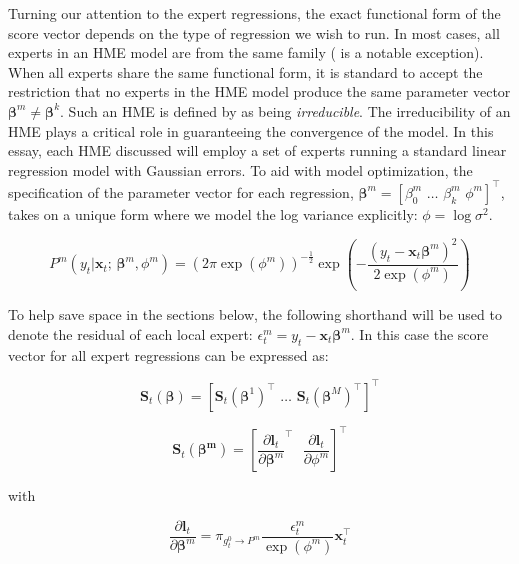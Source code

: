 \documentclass[12pt]{article}
\newcommand{\gateprod}[2]{\pi_{#1 \longrightarrow #2}}
\begin{document}
Turning our attention to the expert regressions, the exact functional form
of the score vector depends on the type of regression we wish to run. In most
cases, all experts in an HME model are from the same family
(\citet{HuertaJiangTanner2003} is a notable exception). When all experts share
the same functional form, it is standard to accept the restriction that no experts
in the HME model produce the same parameter vector
$\boldsymbol{\beta}^{m} \neq \boldsymbol{\beta}^{k}$. Such an HME is defined by
\citet{JiangTanner2000} as being \textit{irreducible}. The irreducibility of an HME
plays a critical role in guaranteeing the convergence of the model.
In this essay, each HME discussed will employ a set of experts running 
a standard linear regression model with Gaussian errors. To aid with model optimization,
the specification of the parameter vector for each regression,
 $\boldsymbol{\beta}^{m} = [\beta_{0}^{m} \,\, \ldots \,\, \beta_{k}^m \,\, \phi^{m}]^{\top}$,
takes on a unique form where we model the log variance explicitly:
$\phi = \log \sigma^{2}$.

\begin{equation}
  P^{m}(y_{t} | \boldsymbol{x}_{t}; \, \boldsymbol{\beta}^{m}, \phi^{m}) = \left( 2 \pi \exp ( \phi^{m} ) \right)^{-\frac{1}{2}} \exp{ \left( -\frac{  ( y_{t} - \boldsymbol{x}_{t} \boldsymbol{\beta}^{m} )^{2}  }{2 \exp (\phi^{m}) } \right) }
\end{equation}

To help save space in the sections below, the following shorthand will be used 
to denote the residual of each local expert: $\epsilon^{m}_{t} = y_{t} - \boldsymbol{x}_{t} \boldsymbol{\beta}^{m}$.
In this case the score vector for all expert regressions can be expressed as:

\begin{equation}
  \boldsymbol{S}_{t}(\boldsymbol{\beta}) = [ \boldsymbol{S}_{t}(\boldsymbol{\beta}^{1})^{\top} \,\, \ldots \,\, \boldsymbol{S}_{t}(\boldsymbol{\beta}^{M})^{\top} ]^{\top}
\end{equation}

\begin{equation} \label{eq:expertScore}
  \boldsymbol{S}_{t}(\boldsymbol{\beta^{m}}) = \left[ \frac{\partial \boldsymbol{l}_{t}}{\partial \boldsymbol{\beta}^{m}}^{\top} \,\,\,\, \frac{\partial \boldsymbol{l}_{t}}{\partial \phi^{m}} \right]^{\top}
\end{equation}

with

\begin{equation} \label{eq:ExpertScoreBeta}
  \frac{\partial \boldsymbol{l}_{t}}{\partial \boldsymbol{\beta}^{m}} = \gateprod{g^{0}_{t}}{P^{m}} \frac{ \epsilon^{m}_{t} }{\exp{(\phi^{m})}} \boldsymbol{x}_{t}^{\top}
\end{equation}
 
\end{document}
